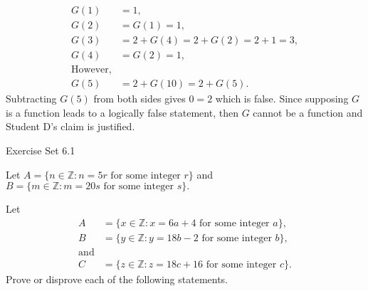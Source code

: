 \documentclass[12pt,letterpaper, onecolumn]{exam}
\begin{document}
\begin{questions}
\begin{solution}
\begin{align*}
			G(1)&=1,\\
			G(2)&=G(1)=1,\\
			G(3)&=2+G(4)=2+G(2)=2+1=3,\\
			G(4)&=G(2)=1,\\
		\text{However,}\\
			G(5)&=2+G(10)=2+G(5).
		\end{align*}
		Subtracting $G(5)$ from both sides gives $0=2$ which is false. Since supposing $G$ is a function leads to a logically false statement, then $G$ cannot be a function and Student D's claim is justified.
	\end{solution} 
	\end{questions}
	
	\centerline{Exercise Set 6.1}
	\begin{questions}
	\setcounter{question}{3}\question Let $A=\{n\in\mathbb{Z}:n=5r \text{ for some integer }r\}$ and $B=\{m\in\mathbb{Z}:m=20s \text{ for some integer } s\}.$
	\begin{solution}
	\end{solution}
	\setcounter{question}{6} \question  
	Let \begin{align*}
		A&=\{x\in\mathbb{Z}:x=6a+4 \text{ for some integer } a\},\\
		B&=\{y\in\mathbb{Z}:y=18b-2\text{ for some integer } b\},\\
		\text{and}\\
		C&=\{z\in\mathbb{Z}:z=18c+16\text{ for some integer }c\}.
	\end{align*}
	Prove or disprove each of the following statements.
	\begin{parts}

\end{parts}
\end{questions}
\end{document}
